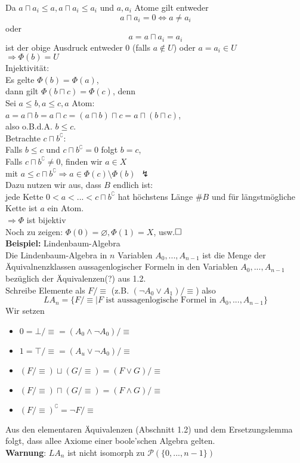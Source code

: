 \documentclass[a4paper]{scrartcl}
\begin{document}
Da $a \sqcap a_i \leq a, a \sqcap a_i \leq a_i $ und $a,a_i$ Atome gilt entweder
$$a \sqcap a_i = 0 \Leftrightarrow a \neq a_i$$
oder
$$a = a \sqcap a_i = a_i$$
ist der obige Ausdruck entweder $0$ (falls $a \notin U$) oder $a = a_i \in U$\\
$\Rightarrow \Phi(b) = U$\medskip\\
Injektivität:\\
Es gelte $\Phi(b) = \Phi(a)$,\\ 
dann gilt $\Phi(b \sqcap c) = \Phi(c)$, denn\medskip\\
Sei $a \leq b, a \leq c, a$ Atom:\\
$a = a \sqcap b = a \sqcap c = (a \sqcap b) \sqcap c = a \sqcap (b \sqcap c)$,\\
also o.B.d.A. $b \leq c$.\smallskip\\
Betrachte $c \sqcap b^\complement$:\\
Falls $b \leq c$ und $c \sqcap b^\complement = 0$ folgt $b=c$,\\
Falls $c \sqcap b^\complement \neq 0$, finden wir $a \in X$\\
mit $a \leq c \sqcap b^\complement \Rightarrow a \in \Phi(c)\setminus \Phi(b)\ \ \lightning$\medskip\\ %
Dazu nutzen wir aus, dass $B$ endlich ist:\\
jede Kette $0 < a < ... < c \sqcap b^\complement$ hat höchstens Länge $\#B$ und für längstmögliche Kette ist $a$ ein Atom.\medskip\\
$\Rightarrow \Phi$ ist bijektiv\medskip\\
Noch zu zeigen: $\Phi(0)= \varnothing, \Phi(1) = X$, usw.$\hfill\square$\medskip\\
\textbf{Beispiel:} Lindenbaum-Algebra\\
Die Lindenbaum-Algebra in $n$ Variablen $A_0,...,A_{n-1}$ ist die Menge der Äquivalnenzklassen aussagenlogischer Formeln in den Variablen $A_0,...,A_{n-1}$ bezüglich der Äquivalenzen(?) aus 1.2.\smallskip\\
Schreibe Elemente als $F/\equiv$ (z.B. $(\lnot A_0 \lor A_1)/\equiv$) also
$$L A_n = \{F/\equiv \mid F\text{ ist aussagenlogische Formel in }A_0,...,A_{n-1}\}$$
Wir setzen
\begin{itemize}
\item $0 = \bot/\equiv = (A_0 \land \lnot A_0)/\equiv$
\item $1 = \top /\equiv = (A_u \lor \lnot A_0)/\equiv$
\item $(F/\equiv)\sqcup(G/\equiv) = (F \lor G)/\equiv$
\item $(F/\equiv) \sqcap (G/\equiv) = (F \land G)/\equiv$
\item $(F/\equiv)^\complement = \lnot F/\equiv$
\end{itemize}
Aus den elementaren Äquivalenzen (Abschnitt 1.2) und dem Ersetzungslemma folgt, dass allee Axiome einer boole'schen Algebra gelten.\medskip\\
\textbf{Warnung}: $L A_n$ ist nicht isomorph zu $\mathcal{P}(\{0,...,n-1\})$\\\\
\end{document}
